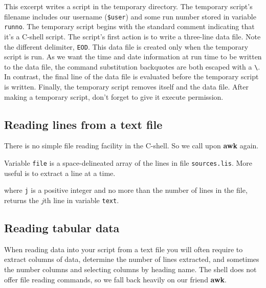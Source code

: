 \documentclass[twoside,11pt,nolof]{starlink}
\begin{document}
This excerpt writes a script in the temporary directory.  The
temporary script's filename includes our username (\texttt{\$user}) and
some run number stored in variable \texttt{runno}.  The temporary script
begins with the standard comment indicating that it's a C-shell
script.  The script's first action is to write a three-line data file.
Note the different delimiter, \texttt{EOD}.  This data file is created
only when the temporary script is run.  As we want the time and date
information at run time to be written to the data file, the command
substitution backquotes are both escaped with a \verb+\+.  In
contrast, the final line of the data file is evaluated before the
temporary script is written.  Finally, the temporary script removes
itself and the data file.  After making a temporary script, don't
forget to give it execute permission.

\subsection{Reading lines from a text file\label{sc4_se_read_lines}}

There is no simple file reading facility in the C-shell.  So we call
upon \textbf{awk} again.

\begin{small}
\end{small}
Variable \texttt{file} is a space-delineated array of the lines in file
\texttt{sources.lis}.  More useful is to extract a line at a time.

\begin{small}
\end{small}
where  \texttt{j} is a positive
integer and no more than the number of lines in the file, returns the $j$th
line in variable \texttt{text}.

\newpage
\subsection{Reading tabular
data\label{sc4_se_read_table}}

When reading data into your script from a text file you will often
require to extract columns of data, determine the number of lines
extracted, and sometimes the number columns and selecting columns by
heading name.  The shell does not offer file reading commands, so we
fall back heavily on our friend \textbf{awk}.
\end{document}
